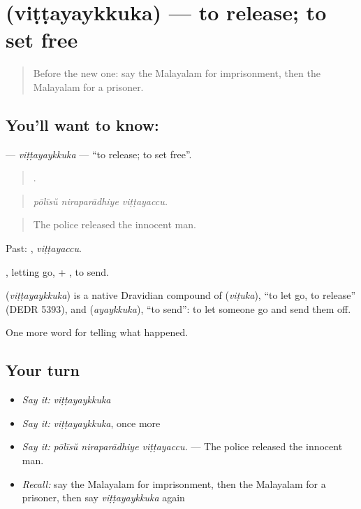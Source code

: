 \section[\texorpdfstring{\ml{വിട്ടയയ്ക്കുക} (viṭṭayaykkuka)}{വിട്ടയയ്ക്കുക (viṭṭayaykkuka)}]{ (viṭṭayaykkuka) — to release; to set free}

\label{lesson:ML-C371-vittayaykkuka}



\begin{quote}
Before the new one: say the Malayalam for imprisonment, then the Malayalam for a prisoner.
\end{quote}

\subsection*{You'll want to know: }
\textbf{} — \emph{viṭṭayaykkuka} — \textquotedblleft{}to release; to set free\textquotedblright{}.

\begin{quote}
  .
\end{quote}

\begin{quote}
\emph{pōlīsŭ niraparādhiye viṭṭayaccu.}
\end{quote}

\begin{quote}
The police released the innocent man.
\end{quote}

Past: , \emph{viṭṭayaccu}.

, letting go, + , to send.

\begin{cousinweb}
\textbf{} (\emph{viṭṭayaykkuka}) is a native Dravidian compound of  (\emph{viṭuka}), \textquotedblleft{}to let go, to release\textquotedblright{} (DEDR 5393), and  (\emph{ayaykkuka}), \textquotedblleft{}to send\textquotedblright{}: to let someone go and send them off.
\end{cousinweb}

\begin{grammarlens}[title={What you've built}]
One more word for telling what happened.
\end{grammarlens}

\subsection*{Your turn}
\begin{itemize}
\raggedright
  \item \emph{Say it:} \emph{viṭṭayaykkuka}
  \item \emph{Say it:} \emph{viṭṭayaykkuka}, once more
  \item \emph{Say it:} \emph{pōlīsŭ niraparādhiye viṭṭayaccu.} — The police released the innocent man.
  \item \emph{Recall:} say the Malayalam for imprisonment, then the Malayalam for a prisoner, then say \emph{viṭṭayaykkuka} again
\end{itemize}

